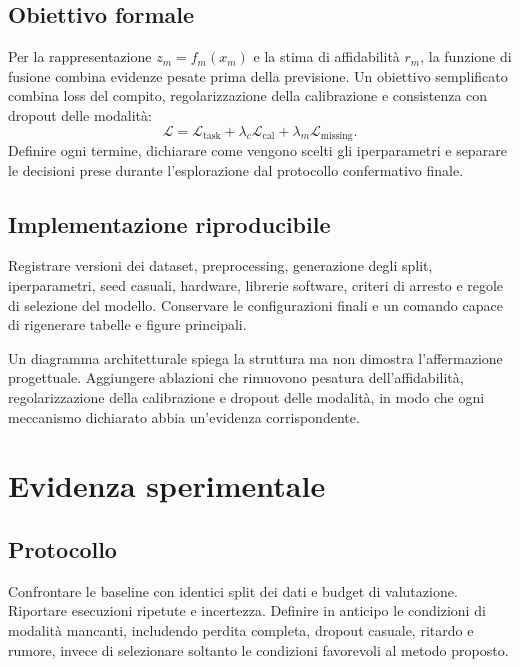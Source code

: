 \section{Obiettivo formale}
Per la rappresentazione $z_m=f_m(x_m)$ e la stima di affidabilità $r_m$, la funzione di fusione combina evidenze pesate prima della previsione. Un obiettivo semplificato combina loss del compito, regolarizzazione della calibrazione e consistenza con dropout delle modalità:
\begin{equation}
\mathcal{L}=\mathcal{L}_{\mathrm{task}}+\lambda_{c}\mathcal{L}_{\mathrm{cal}}+\lambda_{m}\mathcal{L}_{\mathrm{missing}}.
\end{equation}
Definire ogni termine, dichiarare come vengono scelti gli iperparametri e separare le decisioni prese durante l'esplorazione dal protocollo confermativo finale.

\section{Implementazione riproducibile}
Registrare versioni dei dataset, preprocessing, generazione degli split, iperparametri, seed casuali, hardware, librerie software, criteri di arresto e regole di selezione del modello. Conservare le configurazioni finali e un comando capace di rigenerare tabelle e figure principali.

\begin{keypoint}
Un diagramma architetturale spiega la struttura ma non dimostra l'affermazione progettuale. Aggiungere ablazioni che rimuovono pesatura dell'affidabilità, regolarizzazione della calibrazione e dropout delle modalità, in modo che ogni meccanismo dichiarato abbia un'evidenza corrispondente.
\end{keypoint}

\chapter{Evidenza sperimentale}\label{ch:m-results}
\section{Protocollo}
Confrontare le baseline con identici split dei dati e budget di valutazione. Riportare esecuzioni ripetute e incertezza. Definire in anticipo le condizioni di modalità mancanti, includendo perdita completa, dropout casuale, ritardo e rumore, invece di selezionare soltanto le condizioni favorevoli al metodo proposto.

